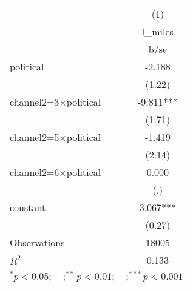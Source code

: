 \begin{tabular}{l*{1}{c}}
\toprule
                    &\multicolumn{1}{c}{(1)}\\
                    &\multicolumn{1}{c}{l\_miles}\\
                    &        b/se   \\
\midrule
political           &      -2.188   \\
                    &      (1.22)   \\
channel2=3$\times$political&      -9.811***\\
                    &      (1.71)   \\
channel2=5$\times$political&      -1.419   \\
                    &      (2.14)   \\
channel2=6$\times$political&       0.000   \\
                    &         (.)   \\
constant            &       3.067***\\
                    &      (0.27)   \\
\midrule
Observations        &       18005   \\
\(R^{2}\)           &       0.133   \\
\bottomrule
\multicolumn{2}{l}{\footnotesize $^{*}p<0.05; \quad ; ^{**} p<0.01; \quad ; ^{***}p<0.001$}\\
\end{tabular}
